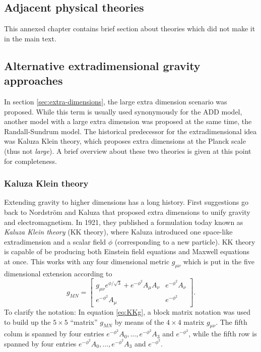 \documentclass[12pt,a4paper]{report}
\numberwithin{equation}{chapter}
\begin{document}
\begin{appendices}
\chapter{Adjacent physical theories}
This annexed chapter contains brief section about theories which did not make it in the main text.


\section{Alternative extradimensional gravity approaches}
In section \ref{sec:extra-dimensions}, the large extra dimension scenario was proposed. While this term is usually used synonymously for the ADD model, another model with a large extra dimension was proposed at the same time, the Randall-Sundrum model. The historical predecessor for the extradimensional idea was Kaluza Klein theory, which proposes extra dimensions at the Planck scale (thus not \emph{large}).
A brief overview about these two theories is given at this point for completeness.

\subsection{Kaluza Klein theory}
Extending gravity to higher dimensions has a long history. First suggestions go back to Nordström and Kaluza \cite{historyGoenner} that proposed extra dimensions to unify gravity and electromagnetism. In 1921, they published a formulation today known as \emph{Kaluza Klein theory} (KK theory), where Kaluza introduced one space-like extradimension and a scalar field $\phi$ (corresponding to a new particle). KK theory is capable of be producing both Einstein field equations and Maxwell equations at once. This works with any four dimensional metric $g_{\mu\nu}$ which is put in the five dimensional extension according to
\begin{equation}\label{eq:KKg}
g_{MN} =
\begin{bmatrix}
g_{\mu\nu} e^{\phi/\sqrt 3} + e^{-\phi^2} A_\mu A_\nu
& e^{-\phi^2} A_\nu \\
e^{-\phi^2} A_\mu & e^{-\phi^2}
\end{bmatrix}.
\end{equation}
To clarify the notation: In equation \eqref{eq:KKg}, a block matrix notation was used to build up the $5\times5$ ``matrix'' $g_{MN}$ by means of the $4 \times 4$ matrix $g_{\mu\nu}$. The fifth colum is spanned by four entries $e^{-\phi^2} A_0, \dots, e^{-\phi^2} A_3$ and $e^{-\phi^2}$, while the fifth row is spanned by four entries $e^{-\phi^2} A_0, \dots, e^{-\phi^2} A_3$ and $e^{-\phi^2}$.


\end{appendices}
\end{document}
